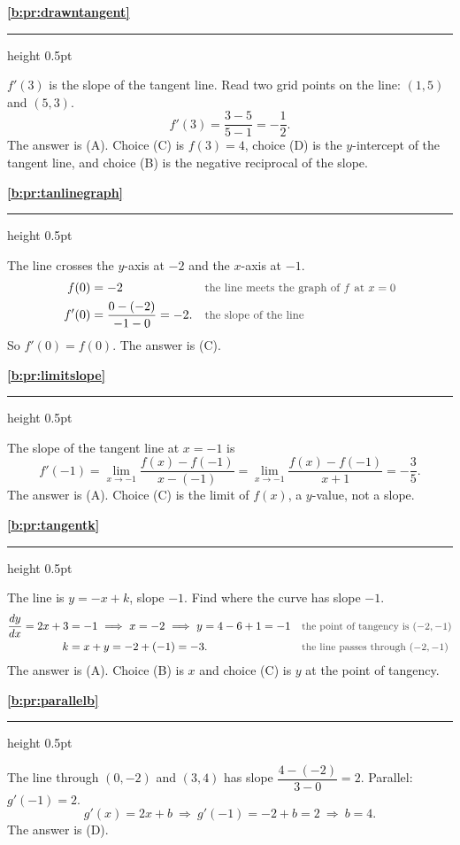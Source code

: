 \documentclass[11pt,a4paper]{article}
\newcommand{\solitem}[2]{%
 \par\addvspace{16pt}\Needspace{10\baselineskip}%
 {\large\bfseries \ref{#1}}\par\nobreak\vspace{2pt}%
 {\color{rulegray}\hrule height 0.5pt}\nobreak\vspace{7pt}%
 #2\par}
\newcommand{\why}[1]{\text{\small\color{darkgray}#1}}
\newcommand{\imp}{\ \Longrightarrow\ }
\begin{document}
\solitem{b:pr:drawntangent}{%
$f'(3)$ is the slope of the tangent line. Read two grid points on the line: $(1,5)$ and $(5,3)$.
\[
f'(3)=\frac{3-5}{5-1}=-\frac12.
\]
The answer is (A). Choice (C) is $f(3)=4$, choice (D) is the $y$-intercept of the tangent line, and choice (B) is the negative reciprocal of the slope.
}

\solitem{b:pr:tanlinegraph}{%
The line crosses the $y$-axis at $-2$ and the $x$-axis at $-1$.
\begin{align*}
f(0)&=-2 &&\why{the line meets the graph of $f$ at $x=0$}\\
f'(0)&=\frac{0-(-2)}{-1-0}=-2. &&\why{the slope of the line}
\end{align*}
So $f'(0)=f(0)$. The answer is (C).
}

\solitem{b:pr:limitslope}{%
The slope of the tangent line at $x=-1$ is
\[
f'(-1)=\lim_{x\to-1}\frac{f(x)-f(-1)}{x-(-1)}=\lim_{x\to-1}\frac{f(x)-f(-1)}{x+1}=-\frac35.
\]
The answer is (A). Choice (C) is the limit of $f(x)$, a $y$-value, not a slope.
}

\solitem{b:pr:tangentk}{%
The line is $y=-x+k$, slope $-1$. Find where the curve has slope $-1$.
\begin{align*}
\frac{dy}{dx}=2x+3&=-1\imp x=-2\imp y=4-6+1=-1 &&\why{the point of tangency is $(-2,-1)$}\\
k&=x+y=-2+(-1)=-3. &&\why{the line passes through $(-2,-1)$}
\end{align*}
The answer is (A). Choice (B) is $x$ and choice (C) is $y$ at the point of tangency.
}

\solitem{b:pr:parallelb}{%
The line through $(0,-2)$ and $(3,4)$ has slope $\dfrac{4-(-2)}{3-0}=2$. Parallel: $g'(-1)=2$.
\[
g'(x)=2x+b\imp g'(-1)=-2+b=2\imp b=4.
\]
The answer is (D).
}
\end{document}
